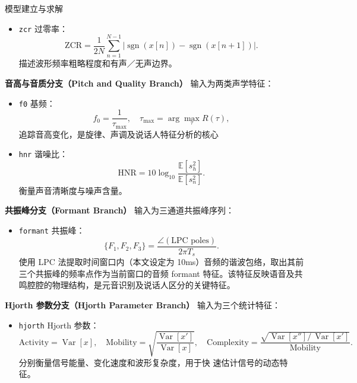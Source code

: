 \documentclass[aspectratio=169]{beamer}
\begin{document}
\begin{frame}{模型建立与求解}
\begin{itemize}
        \item \texttt{zcr} 过零率：
        \begin{equation}
            \mathrm{ZCR} = \frac{1}{2N} \sum_{n=1}^{N-1} \bigl|\operatorname{sgn}(x[n]) - \operatorname{sgn}(x[n+1])\bigr|.
        \end{equation}
        描述波形频率粗略程度和有声／无声边界。
    \end{itemize}
    
\textbf{音高与音质分支（Pitch and Quality Branch）}  
    输入为两类声学特征：
    \begin{itemize}
        \item \texttt{f0} 基频：
        \begin{equation}
            f_0 = \frac{1}{\tau_{\max}},\quad \tau_{\max} = \arg\max_{\tau} R(\tau),
        \end{equation}
        追踪音高变化，是旋律、声调及说话人特征分析的核心
        
        \item \texttt{hnr} 谐噪比：
        \begin{equation}
            \mathrm{HNR} = 10\log_{10}\frac{\mathbb{E}[s_h^2]}{\mathbb{E}[s_n^2]}.
        \end{equation}
        衡量声音清晰度与噪声含量。
    \end{itemize}
    
\textbf{共振峰分支（Formant Branch）}  
    输入为三通道共振峰序列：
    \begin{itemize}
        \item \texttt{formant} 共振峰：
        \begin{equation}
            \{F_1,F_2,F_3\} = \frac{\angle(\text{LPC poles})}{2\pi T_s}.
        \end{equation}
        使用 LPC 法提取时间窗口内（本文设定为 10ms）音频的谐波包络，取出其前三个共振峰的频率点作为当前窗口的音频 formant 特征。该特征反映语音及共鸣腔腔的物理结构，是元音识别及说话人区分的关键特征。
    \end{itemize}
    
\textbf{Hjorth 参数分支（Hjorth Parameter Branch）}  
    输入为三个统计特征：
    \begin{itemize}
        \item \texttt{hjorth} Hjorth 参数：
        \begin{equation}
            \mathrm{Activity} = \operatorname{Var}[x], 
            \quad\mathrm{Mobility} = \sqrt{\frac{\operatorname{Var}[x']}{\operatorname{Var}[x]}},
            \quad\mathrm{Complexity} = \frac{\sqrt{\operatorname{Var}[x'']/\,\operatorname{Var}[x']}}{\mathrm{Mobility}}.
        \end{equation}
        分别衡量信号能量、变化速度和波形复杂度，用于快
速估计信号的动态特征。
    \end{itemize}




\end{frame}
\end{document}
